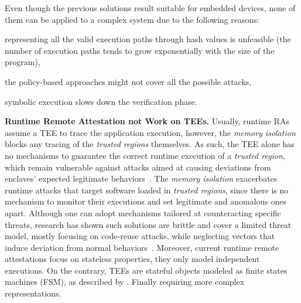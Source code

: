 Even though the previous solutions result suitable for embedded devices, none 
of them can be applied to a complex system due to the following reasons: 
\begin{enumerate*}[label=(\roman*)]
	\item representing all the valid execution paths through hash values is 
	unfeasible (\eg the number of execution paths tends to grow exponentially 
	with the size of the program),
	\item the policy-based approaches might not cover all the possible attacks,
	\item symbolic execution slows down the verification phase.
\end{enumerate*}

\vspace{0.5cm}
\noindent \textbf{Runtime Remote Attestation not Work on TEEs.}
Usually, runtime RAs assume a TEE to trace the application execution, however, 
the \emph{memory isolation} blocks any tracing of the \emph{trusted regions} 
themselves.
As such, the TEE alone has no mechanisms to guarantee the correct runtime 
execution of a \emph{trusted region}, which remain vulnerable against
attacks aimed at causing deviations from enclaves' expected legitimate
behaviors~\citep{tale-two-worlds,251582,biondo2018guard,lee2017hacking,snakegx}.
The \emph{memory isolation} exacerbates runtime attacks that target 
software loaded in \emph{trusted regions}, since there is no mechanism to 
monitor their executions and set legitimate and anomalous ones apart.
Although one can adopt mechanisms tailored at counteracting 
specific threats, research has shown such solutions are brittle and cover a 
limited threat model, mostly focusing on code-reuse attacks, while neglecting 
vectors that induce deviation from normal
behaviors~\citep{tale-two-worlds,251582,biondo2018guard,lee2017hacking}.
Moreover, current runtime remote attestations focus on
stateless properties, \ie they only model independent executions.  On
the contrary, TEEs are stateful objects modeled as finite states
machines (FSM), as described by \cite{costan2016intel}.
Finally requiring more complex representations.
%

